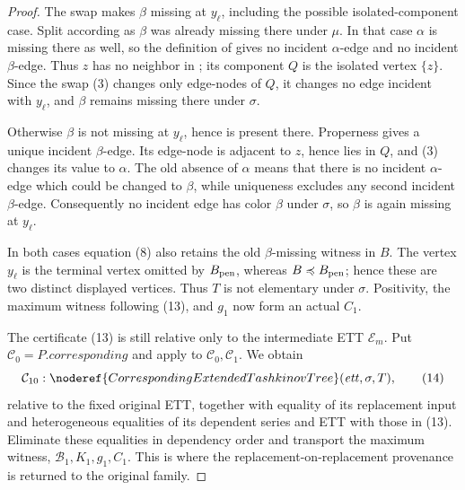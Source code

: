 \begin{proof}
The swap makes \(\beta\) missing at \(y_\ell\), including the possible
isolated-component case.  Split according as \(\beta\) was already missing
there under \(\mu\).  In that case \(\alpha\) is missing there as well, so
the definition of  gives no incident
\(\alpha\)-edge and no incident \(\beta\)-edge.  Thus \(z\) has no
neighbor in ; its component \(Q\) is the
isolated vertex \(\{z\}\).  Since the swap (3) changes only edge-nodes of
\(Q\), it changes no edge incident with \(y_\ell\), and \(\beta\) remains
missing there under \(\sigma\).

Otherwise \(\beta\) is not missing at \(y_\ell\), hence is present there.
Properness gives a unique incident \(\beta\)-edge.  Its edge-node is
adjacent to \(z\), hence lies in \(Q\), and (3) changes its value to
\(\alpha\).  The old absence of \(\alpha\) means that there is no incident
\(\alpha\)-edge which could be changed to \(\beta\), while uniqueness
excludes any second incident \(\beta\)-edge.  Consequently no incident
edge has color \(\beta\) under \(\sigma\), so \(\beta\) is again missing
at \(y_\ell\).

In both cases equation (8) also retains the old \(\beta\)-missing witness
in \(B\).  The vertex \(y_\ell\) is the terminal vertex omitted by
\(B_{\rm pen}\), whereas \(B\preccurlyeq B_{\rm pen}\); hence these are
two distinct displayed vertices.  Thus \(T\) is not elementary under
\(\sigma\).  Positivity, the maximum witness following (13), and \(g_1\)
now form an actual  \(C_1\).

The certificate (13) is still relative only to the intermediate ETT
\(\mathcal E_m\).  Put \(\mathcal C_0=P.\mathit{corresponding}\) and
apply  to
\(\mathcal C_0,\mathcal C_1\).  We obtain
\[
 \mathcal C_{10}:
 \noderef{CorrespondingExtendedTashkinovTree}(\mathit{ett},\sigma,T),
                                                                  \tag{14}
\]
relative to the fixed original ETT, together with equality of its
replacement input and heterogeneous equalities of its dependent series
and ETT with those in (13).  Eliminate these equalities in dependency
order and transport the maximum witness, \(\mathcal B_1,K_1,g_1,C_1\).
This is where the replacement-on-replacement provenance is returned to
the original family.


\end{proof}
